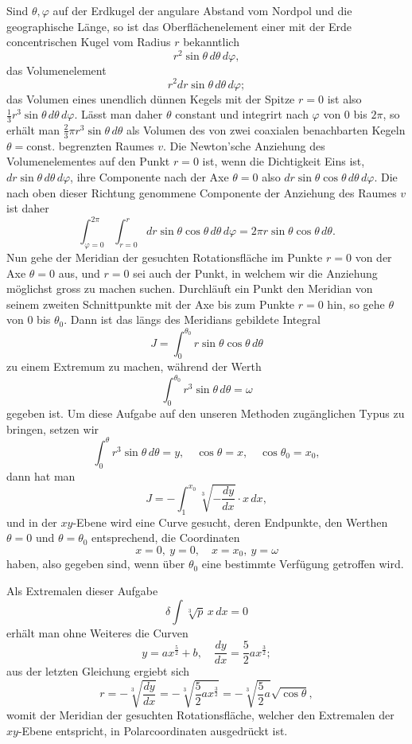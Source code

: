\documentclass[11pt,a4paper,leqno]{article}
\begin{document}
Sind $\theta,\varphi$ auf der Erdkugel der angulare Abstand vom Nordpol und die geographische Länge, so ist das Oberflächenelement einer mit der Erde concentrischen Kugel vom Radius $r$ bekanntlich
\[
r^2\sin\theta\,d\theta\,d\varphi,
\]
das Volumenelement
\[
r^2dr\sin\theta\,d\theta\,d\varphi;
\]
das Volumen eines unendlich dünnen Kegels mit der Spitze $r=0$ ist also $\frac13 r^3\sin\theta\,d\theta\,d\varphi$. Lässt man daher $\theta$ constant und integrirt nach $\varphi$ von 0 bis $2\pi$, so erhält man $\frac23\pi r^3\sin\theta\,d\theta$ als Volumen des von zwei coaxialen benachbarten Kegeln $\theta=\mathrm{const.}$ begrenzten Raumes $v$. Die Newton'sche Anziehung des Volumenelementes auf den Punkt $r=0$ ist, wenn die Dichtigkeit Eins ist, $dr\sin\theta\,d\theta\,d\varphi$, ihre Componente nach der Axe $\theta=0$ also $dr\sin\theta\cos\theta\,d\theta\,d\varphi$. Die nach oben dieser Richtung genommene Componente der Anziehung des Raumes $v$ ist daher
\[
\int_{\varphi=0}^{2\pi}\int_{r=0}^{r}dr\sin\theta\cos\theta\,d\theta\,d\varphi=2\pi r\sin\theta\cos\theta\,d\theta.
\]
Nun gehe der Meridian der gesuchten Rotationsfläche im Punkte $r=0$ von der Axe $\theta=0$ aus, und $r=0$ sei auch der Punkt, in welchem wir die Anziehung möglichst gross zu machen suchen. Durchläuft ein Punkt den Meridian von seinem zweiten Schnittpunkte mit der Axe bis zum Punkte $r=0$ hin, so gehe $\theta$ von 0 bis $\theta_0$. Dann ist das längs des Meridians gebildete Integral
\[
J=\int_0^{\theta_0} r\sin\theta\cos\theta\,d\theta
\]
zu einem Extremum zu machen, während der Werth
\[
\int_0^{\theta_0} r^3\sin\theta\,d\theta=\omega
\]
gegeben ist. Um diese Aufgabe auf den unseren Methoden zugänglichen Typus zu bringen, setzen wir
\[
\int_0^\theta r^3\sin\theta\,d\theta=y,
\quad \cos\theta=x,
\quad \cos\theta_0=x_0,
\]
dann hat man
\[
J=-\int_1^{x_0}\sqrt[3]{-\frac{dy}{dx}}\cdot x\,dx,
\]
und in der $xy$-Ebene wird eine Curve gesucht, deren Endpunkte, den Werthen $\theta=0$ und $\theta=\theta_0$ entsprechend, die Coordinaten
\[
x=0,\ y=0,\quad x=x_0,\ y=\omega
\]
haben, also gegeben sind, wenn über $\theta_0$ eine bestimmte Verfügung getroffen wird.

Als Extremalen dieser Aufgabe
\[
\delta\int \sqrt[3]{p}\,x\,dx=0
\]
erhält man ohne Weiteres die Curven
\[
y=ax^{\frac52}+b,\quad \frac{dy}{dx}=\frac52 ax^{\frac32};
\]
aus der letzten Gleichung ergiebt sich
\[
r=-\sqrt[3]{\frac{dy}{dx}}=-\sqrt[3]{\frac52 ax^{\frac32}}=-\sqrt[3]{\frac52a}\sqrt{\cos\theta},
\]
womit der Meridian der gesuchten Rotationsfläche, welcher den Extremalen der $xy$-Ebene entspricht, in Polarcoordinaten ausgedrückt ist.
\end{document}
